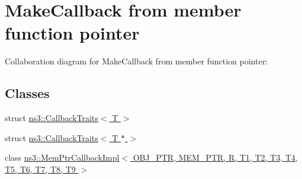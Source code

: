 \hypertarget{group__makecallbackmemptr}{}\section{Make\+Callback from member function pointer}
\label{group__makecallbackmemptr}
Collaboration diagram for Make\+Callback from member function pointer\+:
\subsection*{Classes}
\begin{DoxyCompactItemize}
\item 
struct \hyperlink{structns3_1_1CallbackTraits}{ns3\+::\+Callback\+Traits$<$ T $>$}
\item 
struct \hyperlink{structns3_1_1CallbackTraits_3_01T_01_5_01_4}{ns3\+::\+Callback\+Traits$<$ T $\ast$ $>$}
\item 
class \hyperlink{classns3_1_1MemPtrCallbackImpl}{ns3\+::\+Mem\+Ptr\+Callback\+Impl$<$ O\+B\+J\+\_\+\+P\+T\+R, M\+E\+M\+\_\+\+P\+T\+R, R, T1, T2, T3, T4, T5, T6, T7, T8, T9 $>$}
\end{DoxyCompactItemize}
